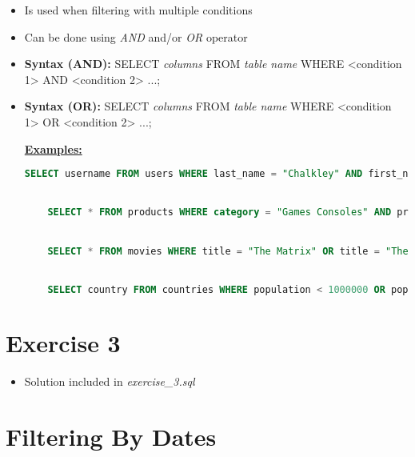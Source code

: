 \documentclass[12pt]{article}
\begin{document}
\begin{itemize}
    \item Is used when filtering with multiple conditions
    \item Can be done using \textit{AND} and/or \textit{OR} operator
    \item \textbf{Syntax (AND):} SELECT \textit{columns} FROM \textit{table name} WHERE <condition 1> AND <condition 2> ...;
    \item \textbf{Syntax (OR):} SELECT \textit{columns} FROM \textit{table name} WHERE <condition 1> OR <condition 2> ...;

    \bigskip

    \underline{\textbf{Examples:}}

    \bigskip

    \begin{lstlisting}[language=SQL]
    SELECT username FROM users WHERE last_name = "Chalkley" AND first_name = "Andrew";


    SELECT * FROM products WHERE category = "Games Consoles" AND price < 400;


    SELECT * FROM movies WHERE title = "The Matrix" OR title = "The Matrix Reloaded" OR title = "The Matrix Revolutions";


    SELECT country FROM countries WHERE population < 1000000 OR population > 100000000;
    \end{lstlisting}
\end{itemize}

\bigskip

\section{Exercise 3}

\bigskip

\begin{itemize}
    \item Solution included in \textit{exercise\_3.sql}
\end{itemize}

\bigskip

\section{Filtering By Dates}

\bigskip
\end{document}
